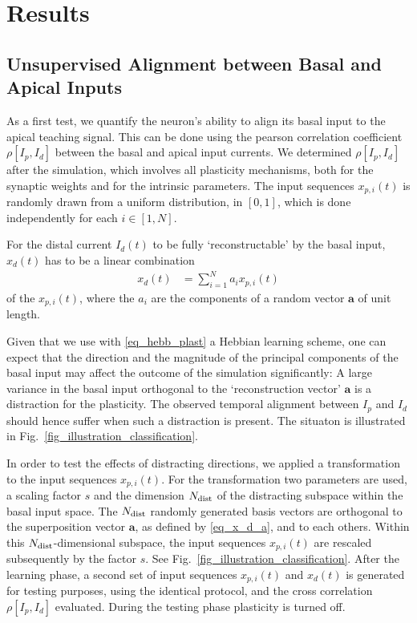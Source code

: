 \documentclass[utf8]{frontiersSCNS} %
\begin{document}
\section{Results}
\label{sect:results}

\subsection{Unsupervised Alignment between Basal and Apical Inputs}
\label{sect:alignment}

As a first test, we quantify the neuron's ability to 
align its basal input to the apical teaching signal.
This can be done using the pearson correlation coefficient
$\rho[I_p,I_d]$ between the basal and 
apical input currents. We determined 
$\rho[I_p,I_d]$ after the simulation,
which involves all plasticity mechanisms, both
for the synaptic weights and for the intrinsic 
parameters. The input sequences $x_{p,i}(t)$ 
is randomly drawn from a uniform distribution,
in $[0,1]$, which is done independently for 
each $i\in[1,N]$.

For the distal current $I_d(t)$ to be fully 
`reconstructable' by the basal input, $x_d(t)$ has 
to be a linear combination 
\begin{align}
x_d(t) &= \sum_{i=1}^N a_i x_{p,i}(t)
\label{eq_x_d_a}
\end{align}
of the $x_{p,i}(t)$, where the $a_i$ are the
components of a random vector $\mathbf{a}$ 
of unit length. 

Given that we use with \eqref{eq_hebb_plast}
a Hebbian learning scheme, one can expect that
the direction and the magnitude of the principal 
components of the basal input may affect the
outcome of the simulation significantly:
A large variance in the basal input 
orthogonal to the `reconstruction vector' $\mathbf{a}$ 
is a distraction for the plasticity. The
observed temporal alignment between $I_p$ and 
$I_d$ should hence suffer when such a 
distraction is present. The situaton is illustrated 
in Fig.~\ref{fig_illustration_classification}.

In order to test the effects of distracting directions,
we applied a transformation to the input sequences $x_{p,i}(t)$.
For the transformation two parameters are used,
a scaling factor $s$ and the dimension $N_{\rm dist}$ 
of the distracting subspace within the basal input 
space. The $N_{\rm dist}$ randomly generated
basis vectors are orthogonal to the superposition
vector $\mathbf{a}$, as defined by \eqref{eq_x_d_a},
and to each others. Within this $N_{\rm dist}$-dimensional 
subspace, the input sequences $x_{p,i}(t)$ are
rescaled subsequently by the factor $s$. 
See Fig.~\ref{fig_illustration_classification}.
After the learning phase, a second set of input 
sequences $x_{p,i}(t)$ and $x_d(t)$ is generated for 
testing purposes, using the identical protocol, and
the cross correlation $\rho[I_p,I_d]$ 
evaluated. During the testing phase plasticity is 
turned off.
\end{document}
